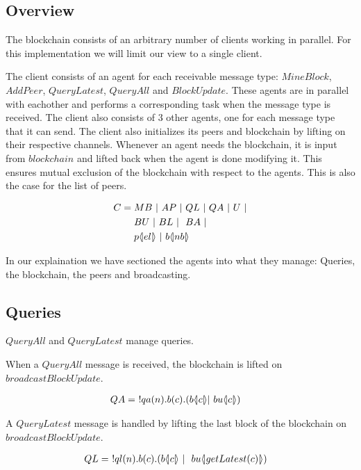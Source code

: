 \FloatBarrier

\subsection{Overview}

The blockchain consists of an arbitrary number of clients working in parallel. For this implementation we will limit our view to a single client.

The client consists of an agent for each receivable message type: $MineBlock$, $AddPeer$, $QueryLatest$, $QueryAll$ and $BlockUpdate$.
These agents are in parallel with eachother and performs a corresponding task when the message type is received.
The client also consists of 3 other agents, one for each message type that it can send.
The client also initializes its peers and blockchain by lifting on their respective channels.
Whenever an agent needs the blockchain, it is input from $blockchain$ and lifted back when the agent is done modifying it.
This ensures mutual exclusion of the blockchain with respect to the agents.
This is also the case for the list of peers.

\begin{align*}
    C &= MB\ |\ AP\ |\ QL\ |\ QA\ |\ U\ |\\
    &\quad \ BU\ |\ BL\ |\ \ BA\ |\\
    &\quad \ p \langle \! | el | \! \rangle\ |\ b \langle \! | nb | \! \rangle
\end{align*}

In our explaination we have sectioned the agents into what they manage: Queries, the blockchain, the peers and broadcasting.

\subsection{Queries}

$QueryAll$ and $QueryLatest$ manage queries.

When a $QueryAll$ message is received, the blockchain is lifted on $broadcastBlockUpdate$.

\begin{align*}
    QA &=\ !qa(n).b(c).(b \langle \! | c | \! \rangle| \ bu \langle \! | c | \! \rangle)
\end{align*}

A $QueryLatest$ message is handled by lifting the last block of the blockchain on $broadcastBlockUpdate$.

\begin{align*}
	QL &=\ !ql(n).b(c).(b  \langle \! | c | \! \rangle\ |\ \ bu \langle \! | getLatest(c) | \! \rangle)
\end{align*}

